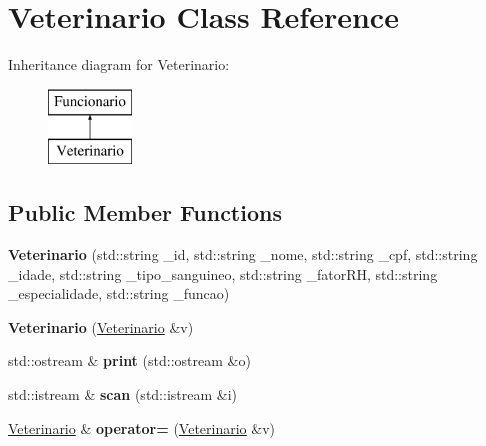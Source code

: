 \hypertarget{classVeterinario}{}\section{Veterinario Class Reference}
\label{classVeterinario}
Inheritance diagram for Veterinario\+:\begin{figure}[H]
\begin{center}
\leavevmode
\includegraphics[height=2.000000cm]{classVeterinario}
\end{center}
\end{figure}
\subsection*{Public Member Functions}
\begin{DoxyCompactItemize}
\item 
\mbox{\label{classVeterinario_a18edd650b6f5d8c134e30df99f96a20f}} 
{\bfseries Veterinario} (std\+::string \+\_\+id, std\+::string \+\_\+nome, std\+::string \+\_\+cpf, std\+::string \+\_\+idade, std\+::string \+\_\+tipo\+\_\+sanguineo, std\+::string \+\_\+fator\+RH, std\+::string \+\_\+especialidade, std\+::string \+\_\+funcao)
\item 
\mbox{\label{classVeterinario_af7a07127569ee82336197f5d1b156081}} 
{\bfseries Veterinario} (\hyperlink{classVeterinario}{Veterinario} \&v)
\item 
\mbox{\label{classVeterinario_a134317f9b85bd72dcc1d3094fa903e40}} 
std\+::ostream \& {\bfseries print} (std\+::ostream \&o)
\item 
\mbox{\label{classVeterinario_ad0909337d5bb3cc79df645cdf2c0af09}} 
std\+::istream \& {\bfseries scan} (std\+::istream \&i)
\item 
\mbox{\label{classVeterinario_ab8f9a3de7aef6e1b26bbcf7e12b3d61b}} 
\hyperlink{classVeterinario}{Veterinario} \& {\bfseries operator=} (\hyperlink{classVeterinario}{Veterinario} \&v)
\end{DoxyCompactItemize}
